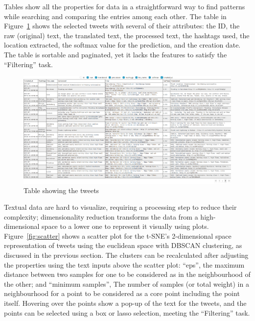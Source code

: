 Tables show all the properties for data in a straightforward way to find patterns while searching
and comparing the entries among each other. The table in Figure~\ref{fig:tweets_table} shows the
selected tweets with several of their attributes: the ID, the raw (original) text, the translated
text, the processed text, the hashtags used, the location extracted, the softmax value for the
prediction, and the creation date. The table is sortable and paginated, yet it lacks the features to
satisfy the ``Filtering'' task.

\begin{figure}[H]
\begin{center}
  \includegraphics[width=\columnwidth]{./images/tweets_table.png}
\end{center}
\caption{Table showing the tweets}
\label{fig:tweets_table}
\end{figure}

Textual data are hard to visualize, requiring a processing step to reduce their complexity;
dimensionality reduction transforms the data from a high-dimensional space to a lower one to
represent it visually using plots. Figure~\ref{fig:scatter} shows a scatter plot for the
\ac{t-SNE}'s 2-dimensional space representation of tweets using the euclidean space with \ac{DBSCAN}
clustering, as discussed in the previous section. The clusters can be recalculated after adjusting
the properties using the text inputs above the scatter plot: ``eps'', the maximum distance between
two samples for one to be considered as in the neighbourhood of the other; and ``minimum samples'',
The number of samples (or total weight) in a neighbourhood for a point to be considered as a core
point including the point itself. Hovering over the points show a pop-up of the text for the tweets,
and the points can be selected using a box or lasso selection, meeting the ``Filtering'' task.

